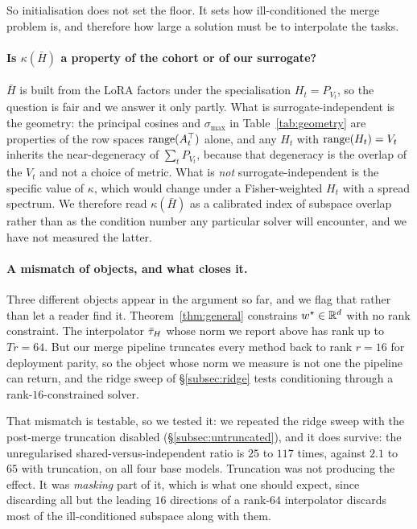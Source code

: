 So initialisation does not set the floor. It sets how ill-conditioned the
merge problem is, and therefore how large a solution must be to interpolate
the tasks.

\paragraph{Is $\kappa(\bar H)$ a property of the cohort or of our
surrogate?} $\bar H$ is built from the LoRA factors under the
specialisation $H_t = P_{V_t}$, so the question is fair and we answer it
only partly. What is surrogate-independent is the geometry: the principal
cosines and $\sigma_{\max}$ in Table~\ref{tab:geometry} are properties of
the row spaces $\operatorname{range}(A_t^\top)$ alone, and any $H_t$ with
$\operatorname{range}(H_t) = V_t$ inherits the near-degeneracy of $\sum_t P_{V_t}$,
because that degeneracy is the overlap of the $V_t$ and not a choice of
metric. What is \emph{not} surrogate-independent is the specific value of
$\kappa$, which would change under a Fisher-weighted $H_t$ with a spread
spectrum. We therefore read $\kappa(\bar H)$ as a calibrated index of
subspace overlap rather than as the condition number any particular solver
will encounter, and we have not measured the latter.

\paragraph{A mismatch of objects, and what closes it.} Three different
objects appear in the argument so far, and we flag that rather than let a
reader find it. Theorem~\ref{thm:general} constrains $w^\star \in \mathbb{R}^d$ with
no rank constraint. The interpolator $\bar{\tau}_H$ whose norm we report above has
rank up to $Tr = 64$. But our merge pipeline truncates every method back to
rank $r = 16$ for deployment parity, so the object whose norm we measure is
not one the pipeline can return, and the ridge sweep of
\S\ref{subsec:ridge} tests conditioning through a rank-$16$-constrained
solver.

That mismatch is testable, so we tested it: we repeated the
ridge sweep with the post-merge truncation disabled
(\S\ref{subsec:untruncated}), and it does survive: the unregularised
shared-versus-independent ratio is $25$ to $117$ times, against $2.1$ to
$65$ with truncation, on all four base models. Truncation was not producing
the effect. It was \emph{masking} part of it, which is what one should
expect, since discarding all but the leading $16$ directions of a rank-$64$
interpolator discards most of the ill-conditioned subspace along with them.

